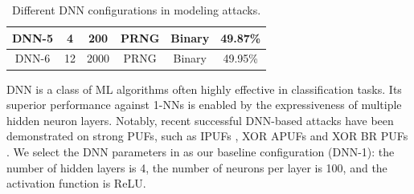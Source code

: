 \begin{table}[t!]
{\begin{tabular}{|c|c|c|c|c|c|}
        DNN-5     & 4                                                       & 200                                                         & PRNG                                                              & Binary                                                  & 49.87\%                                                       \\ \hline
        DNN-6     & 12                                                       & 2000                                                         & PRNG                                                              & Binary                                                  &    49.95\%                                                    \\ \hline
        \end{tabular}
    }
    \vspace{1em}
    \caption{Different DNN configurations in modeling attacks.}
    \label{table:DNNSetting}
    \vspace{-2em}
\end{table}


DNN is a class of ML algorithms often highly effective in classification tasks. 
Its superior performance against 1-NNs is enabled by the expressiveness of multiple hidden neuron layers. Notably, recent successful DNN-based attacks have been demonstrated on strong PUFs, such as IPUFs \cite{DBLP:journals/iacr/SantikellurBC19},  XOR APUFs \cite{DBLP:journals/iacr/SantikellurBC19} and XOR BR PUFs \cite{dnn_xor_br_puf}. We select the DNN parameters in \cite{DBLP:journals/iacr/SantikellurBC19} as our baseline configuration (DNN-1): the number of hidden layers is 4, the number of neurons per layer is 100, and the activation function is ReLU.  


